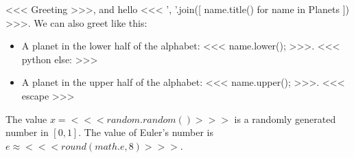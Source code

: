 \documentclass[a4paper]{report}
\begin{document}
    <<< Greeting >>>, and hello <<<
        ', '.join([ name.title() for name in Planets ])
    >>>. We can also greet like this:

    \begin{itemize}
    <<< python
    for name in Planets:
        if re.match(r'^[a-m]', name, re.IGNORECASE):
    >>>
    \item A planet in the lower half of the alphabet: <<< name.lower(); >>>.
    <<< python
        else:
    >>>
    \item A planet in the upper half of the alphabet: <<< name.upper(); >>>.
    <<< escape >>>
    \end{itemize}

    The value $x=<<< random.random() >>>$ is a randomly generated number in $[0,1]$.
    The value of Euler's number is $e\approx<<< round(math.e, 8) >>>$.
\end{document}
